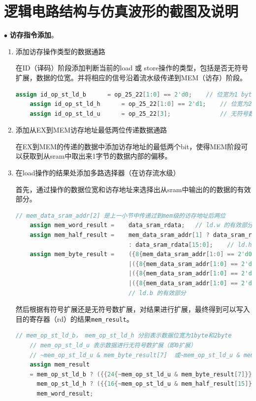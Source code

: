 \documentclass[11pt]{article}
\begin{document}


\section{逻辑电路结构与仿真波形的截图及说明}

\noindent
$\bullet$
\textbf{访存指令添加}。
\begin{enumerate}
  \item 添加访存操作类型的数据通路
  
  在ID（译码）阶段添加判断当前的load 或 store操作的类型，包括是否无符号扩展，数据的位宽。并将相应的信号沿着流水级传递到MEM（访存）阶段。

  \begin{lstlisting}[language=verilog]
    assign id_op_st_ld_b      = op_25_22[1:0] == 2'd0;    // 位宽为1 byte
    assign id_op_st_ld_h      = op_25_22[1:0] == 2'd1;    // 位宽为2 byte
    assign id_op_st_ld_u      = op_25_22[3];              // 无符号数扩展
  \end{lstlisting}
\item 添加从EX到MEM访存地址最低两位传递数据通路

  在EX到MEM的传递的数据中添加访存地址的最低两个bit，使得MEM阶段可以获取到从sram中取出来1字节的数据内部的偏移。

  \item 在load操作的结果处添加多路选择器（在访存流水级）
  
  首先，通过操作的数据位宽和访存地址来选择出从sram中输出的的数据的有效部分。
  \begin{lstlisting}[language=verilog]
    // mem_data_sram_addr[2] 是上一小节中传递过到mem级的访存地址后两位
    assign mem_word_result =    data_sram_rdata;   // ld.w 的有效部分
    assign mem_half_result =    mem_data_sram_addr[1] ? data_sram_rdata[31:16]
                                : data_sram_rdata[15:0];    // ld.h 的有效部分
    assign mem_byte_result =    ({8{mem_data_sram_addr[1:0] == 2'd0}} & data_sram_rdata[7:0])
                                |({8{mem_data_sram_addr[1:0] == 2'd1}} & data_sram_rdata[15:8])
                                |({8{mem_data_sram_addr[1:0] == 2'd2}} & data_sram_rdata[23:16])
                                |({8{mem_data_sram_addr[1:0] == 2'd3}} & data_sram_rdata[31:24]);
                                // ld.b 的有效部分

  \end{lstlisting}

  然后根据有符号扩展还是无符号数扩展，对结果进行扩展，最终得到可以写入目的寄存器（rd）的结果\verb|mem_result|。
  \begin{lstlisting}[language=verilog]
    // mem_op_st_ld_b， mem_op_st_ld_h 分别表示数据位宽为1byte和2byte
    // mem_op_st_ld_u 表示数据进行无符号数扩展（即0扩展）
    // ~mem_op_st_ld_u & mem_byte_result[7]  或~mem_op_st_ld_u & mem_half_result[15] 表示符号位
    assign mem_result 
    = mem_op_st_ld_b ? ({{24{~mem_op_st_ld_u & mem_byte_result[7]}}, mem_byte_result[7:0]}):       
      mem_op_st_ld_h ? ({{16{~mem_op_st_ld_u & mem_half_result[15]}}, mem_half_result[15:0]}) :
      mem_word_result;
  \end{lstlisting}


\end{enumerate}
\end{document}
